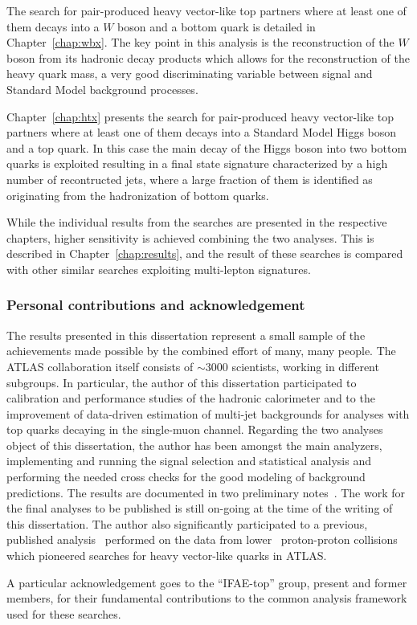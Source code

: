 The search for pair-produced heavy vector-like top partners
where at least one of them decays into a $W$ boson and a bottom
quark is detailed in Chapter~\ref{chap:wbx}. The key point in
this analysis is the reconstruction of the $W$ boson from its
hadronic decay products which allows for the reconstruction
of the heavy quark mass, a very good discriminating variable between
signal and Standard Model background processes.

Chapter~\ref{chap:htx} presents the search for 
pair-produced heavy vector-like top partners
where at least one of them decays into a Standard Model Higgs
boson and a top quark. In this case the main decay of the Higgs
boson into two bottom quarks is exploited resulting in a
final state signature characterized by a high number of recontructed
jets, where a large fraction of them is identified as originating
from the hadronization of bottom quarks.

While the individual results from the searches
are presented in the respective chapters, higher
sensitivity is achieved combining the two analyses.
This is described in Chapter~\ref{chap:results},
and the result of these searches is compared with
other similar searches exploiting multi-lepton signatures.


\subsubsection*{Personal contributions and acknowledgement}

The results presented in this dissertation represent
a small sample of the achievements made possible by
the combined effort of many, many people. The ATLAS
collaboration itself consists of $\sim$3000 scientists,
working in different subgroups. In particular,
the author of this dissertation participated to calibration
and performance studies of the hadronic calorimeter
and to the improvement of data-driven estimation of
multi-jet backgrounds for analyses with top quarks 
decaying in the single-muon channel. Regarding
the two analyses object of this dissertation, the author
has been amongst the main analyzers, implementing and
running the signal selection and statistical analysis and
performing the needed cross checks for the good modeling
of background predictions. %
The results are documented in two preliminary 
notes~\cite{ATLAS-CONF-2013-060,ATLAS-CONF-2013-018}.
The work for the final analyses to be published is still on-going at
the time of the writing of this dissertation.
The author also significantly participated to a previous,
published analysis~\cite{ATLAS:2012qe}
performed on the data from lower \cme\ 
proton-proton collisions which pioneered searches for
heavy vector-like quarks in ATLAS.

A particular acknowledgement goes to the ``IFAE-top''
group, present and former members, for their fundamental
contributions to the common analysis framework used
for these searches.
